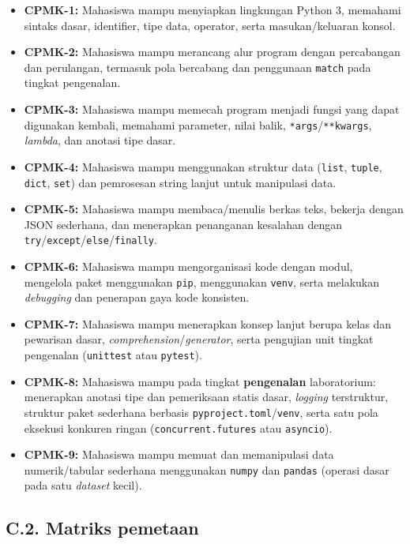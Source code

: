 \documentclass[12pt,a4paper]{article}
\begin{document}
\begin{itemize}[leftmargin=*]
  \item \textbf{CPMK-1:} Mahasiswa mampu menyiapkan lingkungan Python 3, memahami sintaks dasar, identifier, tipe data, operator, serta masukan/keluaran konsol.
  \item \textbf{CPMK-2:} Mahasiswa mampu merancang alur program dengan percabangan dan perulangan, termasuk pola bercabang dan penggunaan \texttt{match} pada tingkat pengenalan.
  \item \textbf{CPMK-3:} Mahasiswa mampu memecah program menjadi fungsi yang dapat digunakan kembali, memahami parameter, nilai balik, \texttt{*args}/\texttt{**kwargs}, \textit{lambda}, dan anotasi tipe dasar.
  \item \textbf{CPMK-4:} Mahasiswa mampu menggunakan struktur data (\texttt{list}, \texttt{tuple}, \texttt{dict}, \texttt{set}) dan pemrosesan string lanjut untuk manipulasi data.
  \item \textbf{CPMK-5:} Mahasiswa mampu membaca/menulis berkas teks, bekerja dengan JSON sederhana, dan menerapkan penanganan kesalahan dengan \texttt{try}/\texttt{except}/\texttt{else}/\texttt{finally}.
  \item \textbf{CPMK-6:} Mahasiswa mampu mengorganisasi kode dengan modul, mengelola paket menggunakan \texttt{pip}, menggunakan \texttt{venv}, serta melakukan \textit{debugging} dan penerapan gaya kode konsisten.
  \item \textbf{CPMK-7:} Mahasiswa mampu menerapkan konsep lanjut berupa kelas dan pewarisan dasar, \textit{comprehension}/\textit{generator}, serta pengujian unit tingkat pengenalan (\texttt{unittest} atau \texttt{pytest}).
  \item \textbf{CPMK-8:} Mahasiswa mampu pada tingkat \textbf{pengenalan} laboratorium: menerapkan anotasi tipe dan pemeriksaan statis dasar, \textit{logging} terstruktur, struktur paket sederhana berbasis \texttt{pyproject.toml}/\texttt{venv}, serta satu pola eksekusi konkuren ringan (\texttt{concurrent.futures} atau \texttt{asyncio}).
  \item \textbf{CPMK-9:} Mahasiswa mampu memuat dan memanipulasi data numerik/tabular sederhana menggunakan \texttt{numpy} dan \texttt{pandas} (operasi dasar pada satu \textit{dataset} kecil).
\end{itemize}

\subsection*{C.2. Matriks pemetaan}
\end{document}
